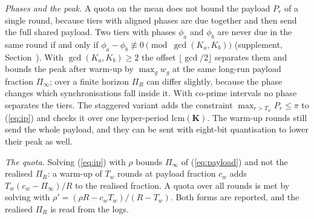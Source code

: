 \documentclass[journal]{IEEEtran}
\begin{document}
\emph{Phases and the peak.} A quota on the mean does not bound the payload $P_r$ of a single round, because tiers with aligned phases are due together and then send the full shared payload. Two tiers with phases $\phi_a$ and $\phi_b$ are never due in the same round if and only if $\phi_a-\phi_b\not\equiv0\pmod{\gcd(K_a,K_b)}$ (supplement, Section~). With $\gcd(K_a,K_b)\ge2$ the offset $\lfloor\gcd/2\rfloor$ separates them and bounds the peak after warm-up by $\max_gw_g$ at the same long-run payload fraction $\Pi_\infty$; over a finite horizon $\Pi_R$ can differ slightly, because the phase changes which synchronisations fall inside it. With co-prime intervals no phase separates the tiers. The staggered variant adds the constraint $\max_{r>T_w}P_r\le\pi$ to (\ref{eq:ip}) and checks it over one hyper-period $\mathrm{lcm}(\mathbf K)$. The warm-up rounds still send the whole payload, and they can be sent with eight-bit quantisation to lower their peak as well.

\emph{The quota.} Solving (\ref{eq:ip}) with $\rho$ bounds $\Pi_\infty$ of (\ref{eq:payload}) and not the realised $\Pi_R$: a warm-up of $T_w$ rounds at payload fraction $c_w$ adds $T_w(c_w-\Pi_\infty)/R$ to the realised fraction. A quota over all rounds is met by solving with $\rho'=(\rho R-c_wT_w)/(R-T_w)$. Both forms are reported, and the realised $\Pi_R$ is read from the logs.
\end{document}
